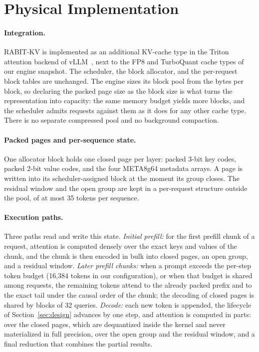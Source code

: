 \documentclass{article}
\begin{document}
\section{Physical Implementation}
\label{sec:impl}

\paragraph{Integration.}
RABIT-KV is implemented as an additional KV-cache type in the Triton attention backend of
vLLM~\citep{kwon2023vllm}, next to the FP8 and TurboQuant cache types of our engine snapshot.
The scheduler, the block allocator, and the per-request block tables are unchanged. The engine sizes
its block pool from the bytes per block, so declaring the packed page size as the block size is what
turns the representation into capacity: the same memory budget yields more blocks, and the scheduler
admits requests against them as it does for any other cache type. There is no separate compressed pool
and no background compaction.

\paragraph{Packed pages and per-sequence state.}
One allocator block holds one closed page per layer: packed 3-bit key codes, packed 2-bit value codes,
and the four META8g64 metadata arrays. A page is written into its scheduler-assigned block at the
moment its group closes. The residual window and the open group are kept in a per-request
structure outside the pool, of at most 35 tokens per sequence.

\paragraph{Execution paths.}
Three paths read and write this state. \emph{Initial prefill:} for the first prefill chunk of a
request, attention is computed densely over the exact keys and values of the chunk, and the chunk is
then encoded in bulk into closed pages, an open group, and a residual window. \emph{Later prefill
chunks:} when a prompt exceeds the per-step token budget (16,384 tokens in our configuration), or when
that budget is shared among requests, the remaining tokens attend to the already packed prefix and to
the exact tail under the causal order of the chunk; the decoding of closed pages is shared by blocks of
32 queries. \emph{Decode:} each new token is appended, the lifecycle of Section~\ref{sec:design}
advances by one step, and attention is computed in parts: over the closed pages, which are dequantized
inside the kernel and never materialized in full precision, over the open group and the residual
window, and a final reduction that combines the partial results.
\end{document}
